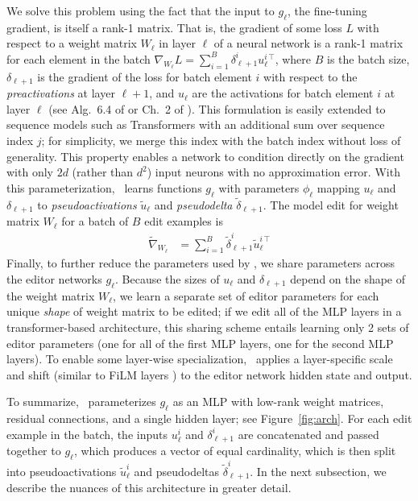 \documentclass{article}
\begin{document}
We solve this problem using the fact that the input to $g_\ell$, the fine-tuning gradient, is itself a rank-1 matrix. That is, the gradient of some loss $L$ with respect to a weight matrix $W_{\ell}$ in layer $\ell$ of a neural network is a rank-1 matrix for each element in the batch $\nabla_{W_\ell}L = \sum_{i=1}^B\delta_{\ell + 1}^i{u_\ell^{i\,\top}}$, where $B$ is the batch size, $\delta_{\ell+1}$ is the gradient of the loss for batch element $i$ with respect to the \textit{preactivations} at layer $\ell+1$, and $u_\ell$ are the activations for batch element $i$ at layer $\ell$ (see Alg.~6.4 of \citealp{Goodfellow-et-al-2016} or Ch.~2 of \citealp{nielsen2015neural}). This formulation is easily extended to sequence models such as Transformers \citep{vaswani2017attention,radford2019language} with an additional sum over sequence index $j$; for simplicity, we merge this index with the batch index without loss of generality. This property enables a network to condition directly on the gradient with only $2d$ (rather than $d^2$) input neurons with no approximation error. With this parameterization, \name~learns functions $g_\ell$ with parameters $\phi_\ell$ mapping $u_\ell$ and $\delta_{\ell+1}$ to \textit{pseudoactivations} $\tilde u_\ell$ and \textit{pseudodelta} $\tilde\delta_{\ell+1}$. The model edit for weight matrix $W_\ell$ for a batch of $B$ edit examples is
\begin{align}
    \tilde{\nabla}_{W_\ell} &= \sum_{i=1}^B\tilde\delta_{\ell + 1}^{i}{\tilde u_\ell^{i\,\top}}
\end{align}
Finally, to further reduce the parameters used by \name, we share parameters across the editor networks $g_\ell$. Because the sizes of $u_\ell$ and $\delta_{\ell+1}$ depend on the shape of the weight matrix $W_\ell$, we learn a separate set of editor parameters for each unique \textit{shape} of weight matrix to be edited; if we edit all of the MLP layers in a transformer-based architecture, this sharing scheme entails learning only 2 sets of editor parameters (one for all of the first MLP layers, one for the second MLP layers). To enable some layer-wise specialization, \name~applies a layer-specific scale and shift (similar to FiLM layers \citep{perez2018film}) to the editor network hidden state and output.

To summarize, \name~parameterizes $g_\ell$ as an MLP with low-rank weight matrices, residual connections, and a single hidden layer; see Figure~\ref{fig:arch}. For each edit example in the batch, the inputs $u_\ell^i$ and $\delta_{\ell+1}^i$ are concatenated and passed together to $g_\ell$, which produces a vector of equal cardinality, which is then split into pseudoactivations $\tilde u_\ell^i$ and pseudodeltas $\tilde \delta_{\ell+1}^i$. In the next subsection, we describe the nuances of this architecture in greater detail. 
\end{document}
